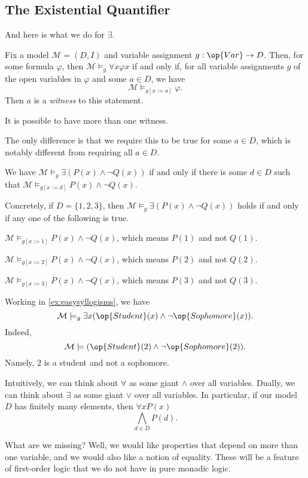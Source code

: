 \subsection{The Existential Quantifier}
And here is what we do for $\exists$.
\begin{definition}
	Fix a model $\mathcal M=(D,I)$ and variable assignment $g:\op{Var}\to D$. Then, for some formula $\varphi$, then $\mathcal M\models_g\forall x\varphi x$ if and only if, for all variable assignments $g$ of the open variables in $\varphi$ and some $a\in D$, we have
	\[\mathcal M\models_{g[x:=a]}\varphi.\]
	Then $a$ is a \textit{witness} to this statement.
\end{definition}
\begin{remark}
	It is possible to have more than one witness.
\end{remark}
The only difference is that we require this to be true for some $a\in D$, which is notably different from requiring all $a\in D$.
\begin{example}
	We have $\mathcal M\models_g\exists(P(x)\land\lnot Q(x))$ if and only if there is some $d\in D$ such that $\mathcal M\models_{g[x:=d]}P(x)\land\lnot Q(x)$.

	Concretely, if $D=\{1,2,3\}$, then $\mathcal M\models_g\exists(P(x)\land\lnot Q(x))$ holds if and only if any one of the following is true.
	\begin{listroman}
		\item $\mathcal M\models_{g[x:=1]}P(x)\land\lnot Q(x)$, which means $P(1)$ and not $Q(1)$.
		\item $\mathcal M\models_{g[x:=2]}P(x)\land\lnot Q(x)$, which means $P(2)$ and not $Q(2)$.
		\item $\mathcal M\models_{g[x:=3]}P(x)\land\lnot Q(x)$, which means $P(3)$ and not $Q(3)$.
	\end{listroman}
\end{example}
\begin{example}
	Working in \autoref{ex:easysyllogisms}, we have
	\[\mathcal M\models_g\exists x(\op{Student}(x)\land\lnot\op{Sophomore}(x)).\]
	Indeed,
	\[\mathcal M\models(\op{Student}(2)\land\lnot\op{Sophomore}(2)).\]
	Namely, $2$ is a student and not a sophomore.
\end{example}
\begin{remark}
	Intuitively, we can think about $\forall$ as some giant $\land$ over all variables. Dually, we can think about $\exists$ as some giant $\lor$ over all variables. In particular, if our model $D$ has finitely many elements, then $\forall xP(x)$
	\[\bigwedge_{d\in D}P(d).\]
\end{remark}
What are we missing? Well, we would like properties that depend on more than one variable, and we would also like a notion of equality. These will be a feature of first-order logic that we do not have in pure monadic logic.

